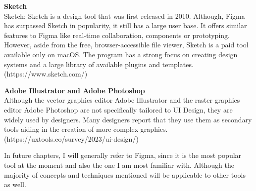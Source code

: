 \textbf{Sketch}\\
Sketch: Sketch is a design tool that was first released in 2010. Although, Figma has surpassed
Sketch in popularity, it still has a large user base. It offers similar features to Figma like
real-time collaboration, components or prototyping. However, aside from the free, browser-accessible
file viewer, Sketch is a paid tool available only on macOS. The program has a strong focus on
creating design systems and a large library of available plugins and templates.
(https://www.sketch.com/)

\textbf{Adobe Illustrator and Adobe Photoshop}\\
Although the vector graphics editor Adobe Illustrator and the raster graphics editor Adobe Photoshop
are not specifically tailored to UI Design, they are widely used by designers. Many designers report
that they use them as secondary tools aiding in the creation of more complex graphics.
(https://uxtools.co/survey/2023/ui-design/)

In future chapters, I will generally refer to Figma, since it is the most popular tool at the moment
and also the one I am most familiar with. Although the majority of concepts and techniques mentioned
will be applicable to other tools as well.
